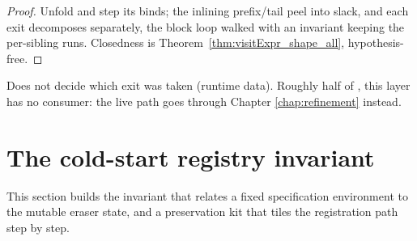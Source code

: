 \begin{proof}
\leanok
{}
 Unfold  and step its binds; the inlining prefix/tail peel into
 slack, and each exit decomposes separately, the block loop walked with an invariant
keeping the per-sibling runs. Closedness is Theorem~\ref{thm:visitExpr_shape_all}, hypothesis-free.
\end{proof}
\begin{remark}
 Does not decide which exit was taken (runtime data). Roughly half of
, this layer has no consumer: the live path goes through Chapter
\ref{chap:refinement} instead.
\end{remark}

\section{The cold-start registry invariant}
\label{sec:coldstart:reginv}

This section builds the invariant that relates a fixed specification environment to the mutable eraser
state, and a preservation kit that tiles the registration path step by step.

